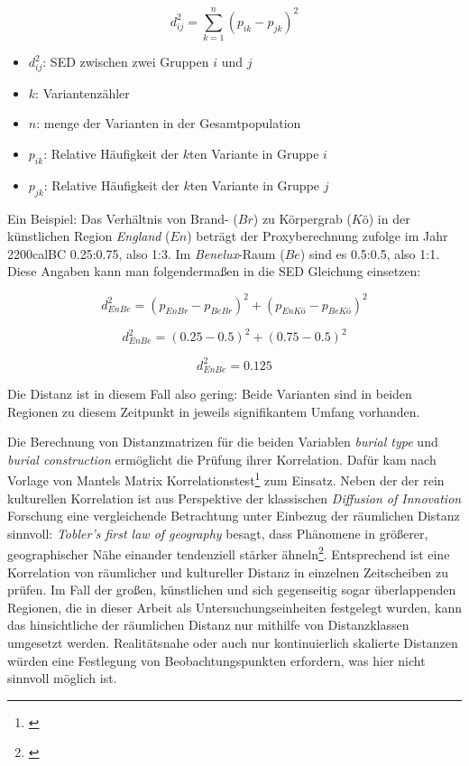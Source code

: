 \documentclass[openany,twoside,twocolumn]{book}
\providecommand{\tightlist}{%
  \setlength{\itemsep}{0pt}\setlength{\parskip}{0pt}}
\let\rmarkdownfootnote\footnote%
\def\footnote{\protect\rmarkdownfootnote}
\begin{document}
\[d_{ij}^2 = \sum_{k = 1}^{n} (p_{ik} - p_{jk})^2\]

\begin{itemize}
\tightlist
\item
  \(d_{ij}^2\): SED zwischen zwei Gruppen \(i\) und \(j\)
\item
  \(k\): Variantenzähler
\item
  \(n\): menge der Varianten in der Gesamtpopulation
\item
  \(p_{ik}\): Relative Häufigkeit der \(k\)ten Variante in Gruppe \(i\)
\item
  \(p_{jk}\): Relative Häufigkeit der \(k\)ten Variante in Gruppe \(j\)
\end{itemize}

Ein Beispiel: Das Verhältnis von Brand- (\(Br\)) zu Körpergrab (\(Kö\)) in der künstlichen Region \emph{England} (\(En\)) beträgt der Proxyberechnung zufolge im Jahr 2200calBC 0.25:0.75, also 1:3. Im \emph{Benelux}-Raum (\(Be\)) sind es 0.5:0.5, also 1:1. Diese Angaben kann man folgendermaßen in die SED Gleichung einsetzen:

\[d_{En Be}^2 = (p_{En Br} - p_{Be Br})^2 + (p_{En Kö} - p_{Be Kö})^2\]

\[d_{En Be}^2 = (0.25 - 0.5)^2 + (0.75 - 0.5)^2\]

\[d_{En Be}^2 = 0.125\]

Die Distanz ist in diesem Fall also gering: Beide Varianten sind in beiden Regionen zu diesem Zeitpunkt in jeweils signifikantem Umfang vorhanden.

Die Berechnung von Distanzmatrizen für die beiden Variablen \emph{burial type} und \emph{burial construction} ermöglicht die Prüfung ihrer Korrelation. Dafür kam nach Vorlage von \textcite{porcic_simulating_2014} Mantels Matrix Korrelationstest\footnote{\textcite{mantel_detection_1967}} zum Einsatz. Neben der der rein kulturellen Korrelation ist aus Perspektive der klassischen \emph{Diffusion of Innovation} Forschung eine vergleichende Betrachtung unter Einbezug der räumlichen Distanz sinnvoll: \emph{Tobler's first law of geography} besagt, dass Phänomene in größerer, geographischer Nähe einander tendenziell stärker ähneln\footnote{\textcite{tobler_computer_1970}}. Entsprechend ist eine Korrelation von räumlicher und kultureller Distanz in einzelnen Zeitscheiben zu prüfen. Im Fall der großen, künstlichen und sich gegenseitig sogar überlappenden Regionen, die in dieser Arbeit als Untersuchungseinheiten festgelegt wurden, kann das hinsichtliche der räumlichen Distanz nur mithilfe von Distanzklassen umgesetzt werden. Realitätsnahe oder auch nur kontinuierlich skalierte Distanzen würden eine Festlegung von Beobachtungspunkten erfordern, was hier nicht sinnvoll möglich ist.
\end{document}
